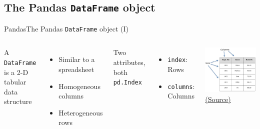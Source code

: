\documentclass[10pt,compress]{beamer} %
\begin{document}
\subsection{The Pandas \texttt{DataFrame} object}
\begin{frame}{Pandas}{The Pandas \texttt{DataFrame} object (I)}
	\begin{columns}
		A \texttt{DataFrame} is a 2-D tabular data structure
		\begin{itemize}
			\item Similar to a spreadsheet
			\item Homogeneous columns
			\item Heterogeneous rows
		\end{itemize}
		Two attributes, both \texttt{pd.Index}
		\begin{itemize}
			\item \texttt{index}: Rows
			\item \texttt{columns}: Columns
		\end{itemize}

		\centering \includegraphics[width=\textwidth]{figs/structure_table.jpg}\\
		\tiny \href{https://www.tutorialspoint.com/python\_pandas/python\_pandas\_dataframe.htm}{(Source)}
	\end{columns}
\end{frame}
\end{document}
